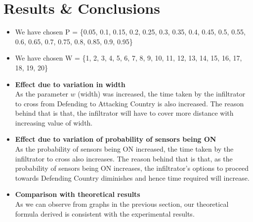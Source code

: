 \documentclass[12pt]{article}
\begin{document}
\section{Results \& Conclusions}
\begin{itemize}
    \item We have chosen P = \{0.05, 0.1,  0.15, 0.2, 0.25, 0.3, 0.35, 0.4, 0.45, 0.5, 0.55, 0.6, 0.65, 0.7, 0.75, 0.8, 0.85, 0.9, 0.95\}
    \item We have chosen W = \{1, 2, 3, 4, 5, 6, 7, 8, 9, 10, 11, 12, 13, 14, 15, 16, 17, 18, 19, 20\}
    \item \textbf{Effect due to variation in width} \\
    As the parameter $w$ (width) was increased, the time taken by the infiltrator to cross from Defending to Attacking Country is also increased. The reason behind that is that, the infiltrator will have to cover more distance with increasing value of width.
    \item \textbf{Effect due to variation of probability of sensors being ON} \\
    As the probability of sensors being ON increased, the time taken by the infiltrator to cross also increases. The reason behind that is that, as the probability of sensors being ON increases, the infiltrator's options to proceed towards Defending Country diminishes and hence time required will increase.
    \item \textbf{Comparison with theoretical results} \\
    As we can observe from graphs in the previous section, our theoretical formula derived is consistent with the experimental results.
\end{itemize}

\end{document}
